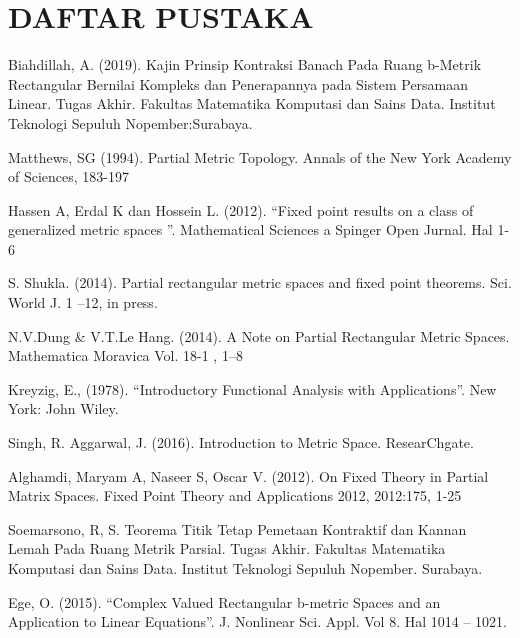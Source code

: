 \documentclass[12pt]{article}
\numberwithin{lemma}{subsection}
\begin{document}
\pagestyle{empty}
\section{DAFTAR PUSTAKA}
\vspace{-1cm}
\begin{thebibliography}{10}
	
	 Biahdillah, A. (2019). Kajin Prinsip Kontraksi Banach Pada Ruang b-Metrik Rectangular Bernilai Kompleks dan Penerapannya pada Sistem Persamaan Linear. Tugas Akhir. Fakultas Matematika Komputasi dan Sains Data. Institut Teknologi Sepuluh Nopember:Surabaya.
	
	 Matthews, SG (1994). Partial Metric Topology. Annals of the New York Academy of Sciences, 183-197
	
		Hassen A, Erdal K dan Hossein L. (2012). “Fixed point results on a class of generalized
	metric spaces
   ”. Mathematical Sciences a Spinger Open Jurnal. Hal 1-6
   
   
	
	S. Shukla. (2014). Partial rectangular metric spaces and fixed point theorems. Sci. World J. 1 –12, in press.
	
	 N.V.Dung \& V.T.Le Hang. (2014). A Note on Partial Rectangular Metric Spaces. Mathematica Moravica Vol. 18-1 , 1–8
	
	Kreyzig, E., (1978). “Introductory Functional Analysis with Applications”. New York: John Wiley.
	

	
	Singh, R. Aggarwal, J. (2016). Introduction to Metric Space. ResearChgate. 
	
	 Alghamdi, Maryam A, Naseer S, Oscar V. (2012). On Fixed Theory in Partial Matrix Spaces. Fixed Point Theory and Applications 2012, 2012:175, 1-25
	
	Soemarsono, R, S. Teorema Titik Tetap Pemetaan Kontraktif dan Kannan Lemah Pada Ruang Metrik Parsial. Tugas Akhir. Fakultas Matematika Komputasi dan Sains Data. Institut Teknologi Sepuluh Nopember. Surabaya.

 
	Ege, O. (2015). “Complex Valued Rectangular b-metric Spaces and an Application to Linear Equations”. J. Nonlinear Sci. Appl. Vol 8. Hal 1014 – 1021.
	
	
	\end{thebibliography}
\end{document}
